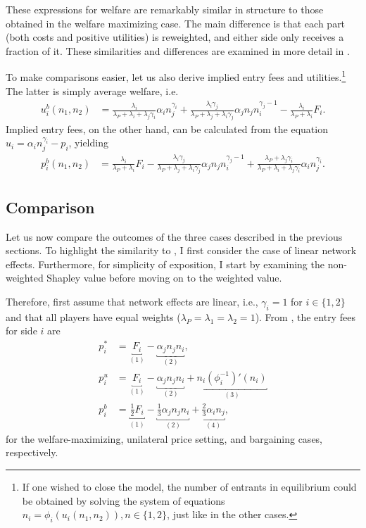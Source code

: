 These expressions for welfare are remarkably similar in structure to those obtained in the welfare maximizing case.
The main difference is that each part (both costs and positive utilities) is reweighted, and either side only receives a fraction of it.
These similarities and differences are examined in more detail in .

To make comparisons easier, let us also derive implied entry fees and utilities.\footnote{
    If one wished to close the model, the number of entrants in equilibrium could be obtained by solving the system of equations $n_i = \phi_i(u_i(n_1, n_2)), n \in \{1, 2\}$, just like in the other cases.
}
The latter is simply average welfare, i.e.
\begin{align*}
    u_i^b(n_1, n_2) &= \frac{\lambda_i}{\lambda_P + \lambda_i + \lambda_j\gamma_i} \alpha_i n_j^{\gamma_i} + \frac{\lambda_i \gamma_j}{\lambda_P + \lambda_j + \lambda_i\gamma_j} \alpha_j n_j n_i^{\gamma_j - 1} - \frac{\lambda_i}{\lambda_P + \lambda_i} F_i.
\end{align*}
Implied entry fees, on the other hand, can be calculated from the equation $u_i = \alpha_i n_j^{\gamma_i} - p_i$, yielding
\begin{align}
    p_i^b(n_1, n_2) &= \frac{\lambda_i}{\lambda_P + \lambda_i} F_i - \frac{\lambda_i \gamma_j}{\lambda_P + \lambda_j + \lambda_i\gamma_j} \alpha_j n_j n_i^{\gamma_j - 1} + \frac{\lambda_P + \lambda_j\gamma_i}{\lambda_P + \lambda_i + \lambda_j\gamma_i} \alpha_i n_j^{\gamma_i}.  \label{eq:bargaining_entry_fees}
\end{align}

\subsection{Comparison}
\label{sec:application_comparison}

Let us now compare the outcomes of the three cases described in the previous sections.
To highlight the similarity to \textcite{armstrong2006competition}, I first consider the case of linear network effects.
Furthermore, for simplicity of exposition, I start by examining the non-weighted Shapley value before moving on to the weighted value.

Therefore, first assume that network effects are linear, i.e., $\gamma_i = 1$ for $i \in \{1, 2\}$ and that all players have equal weights ($\lambda_P = \lambda_1 = \lambda_2 = 1$).
From , the entry fees for side $i$ are
\begin{align*}
    p_i^* &= \underbracket{F_i}_{(1)} - \underbracket{\alpha_j n_j n_i}_{(2)}, \\
    p_i^u &= \underbracket{F_i}_{(1)} - \underbracket{\alpha_j n_j n_i}_{(2)} + \underbracket{n_i (\phi_i^{-1})'(n_i)}_{(3)} \\
    p_i^b &= \underbracket{\frac{1}{2} F_i}_{(1)} - \underbracket{\frac{1}{3} \alpha_j n_j n_i}_{(2)} + \underbracket{\frac{2}{3} \alpha_i n_j}_{(4)},
\end{align*}
for the welfare-maximizing, unilateral price setting, and bargaining cases, respectively.

